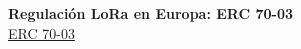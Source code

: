 \documentclass[12pt]{article}
\newcommand{\subsubsubsection}[1]{\paragraph{#1}\mbox{}\\}
\begin{document}
	 
	
	\noindent  \textbf{Regulación LoRa en Europa: ERC 70-03} \\
	
	\noindent \href{https://docdb.cept.org/download/25c41779-cd6e/Rec7003e.pdf}{ERC 70-03} \\
	
	
	\pagebreak
	
	
	
	
	
	
	
\end{document}
